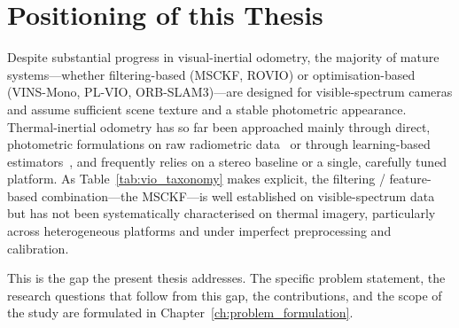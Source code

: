 \section{Positioning of this Thesis}
\label{sec:rw_positioning}

Despite substantial progress in visual-inertial odometry, the majority of mature systems---whether filtering-based (MSCKF, ROVIO) or optimisation-based (VINS-Mono, PL-VIO, ORB-SLAM3)---are designed for visible-spectrum cameras and assume sufficient scene texture and a stable photometric appearance. 
Thermal-inertial odometry has so far been approached mainly through direct, photometric formulations on raw radiometric data~\cite{Khattak_2019, Doer_2021} or through learning-based estimators~\cite{Saputra_2020}, and frequently relies on a stereo baseline or a single, carefully tuned platform. As Table~\ref{tab:vio_taxonomy} makes explicit, the filtering / feature-based combination---the MSCKF---is well established on visible-spectrum data but has not been systematically characterised on thermal imagery, particularly across heterogeneous platforms and under imperfect preprocessing and calibration.

This is the gap the present thesis addresses. The specific problem statement, the research questions that follow from this gap, the contributions, and the scope of the study are formulated in Chapter~\ref{ch:problem_formulation}.
